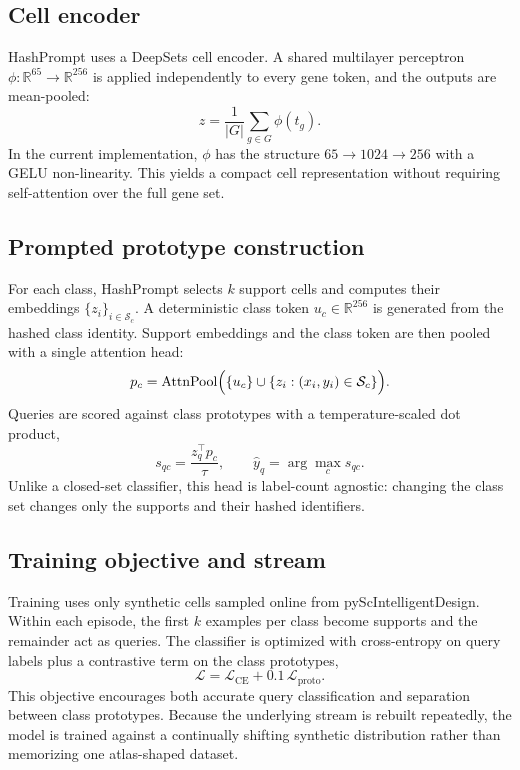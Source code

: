 \documentclass{article}
\begin{document}
\subsection{Cell encoder}
HashPrompt uses a DeepSets cell encoder. A shared multilayer perceptron $\phi : \mathbb{R}^{65} \rightarrow \mathbb{R}^{256}$ is applied independently to every gene token, and the outputs are mean-pooled:
\begin{equation}
    z = \frac{1}{|G|}\sum_{g \in G} \phi(t_g).
\end{equation}
In the current implementation, $\phi$ has the structure $65 \rightarrow 1024 \rightarrow 256$ with a GELU non-linearity. This yields a compact cell representation without requiring self-attention over the full gene set.

\subsection{Prompted prototype construction}
For each class, HashPrompt selects $k$ support cells and computes their embeddings $\{z_i\}_{i \in \mathcal{S}_c}$. A deterministic class token $u_c \in \mathbb{R}^{256}$ is generated from the hashed class identity. Support embeddings and the class token are then pooled with a single attention head:
\begin{equation}
    p_c = \mathrm{AttnPool}\Bigl(\{u_c\} \cup \{z_i : (x_i, y_i) \in \mathcal{S}_c\}\Bigr).
\end{equation}
Queries are scored against class prototypes with a temperature-scaled dot product,
\begin{equation}
    s_{qc} = \frac{z_q^{\top} p_c}{\tau}, \qquad \hat{y}_q = \arg\max_c s_{qc}.
\end{equation}
Unlike a closed-set classifier, this head is label-count agnostic: changing the class set changes only the supports and their hashed identifiers.

\subsection{Training objective and stream}
Training uses only synthetic cells sampled online from pyScIntelligentDesign. Within each episode, the first $k$ examples per class become supports and the remainder act as queries. The classifier is optimized with cross-entropy on query labels plus a contrastive term on the class prototypes,
\begin{equation}
    \mathcal{L} = \mathcal{L}_{\mathrm{CE}} + 0.1\,\mathcal{L}_{\mathrm{proto}}.
\end{equation}
This objective encourages both accurate query classification and separation between class prototypes. Because the underlying stream is rebuilt repeatedly, the model is trained against a continually shifting synthetic distribution rather than memorizing one atlas-shaped dataset.
\end{document}
